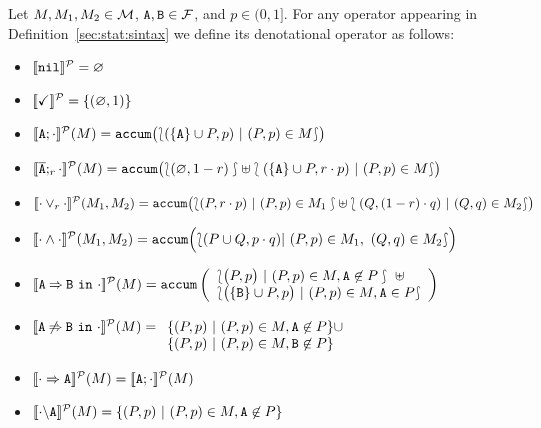 \bdfn\label{def:semantic:operators}
  Let $M,M_1,M_2\in{\cal M}$, ${\mathtt{A}},{\mathtt{B}}\in{\cal F}$, and $p\in(0,1]$. For any operator appearing in
  Definition~\ref{sec:stat:sintax} we define its denotational operator
  as follows:
  \begin{itemize}

  \item $[\![\mathtt{nil}]\!]^{\cal P}=\varnothing$

  \item $[\![\checkmark]\!]^{\cal P}=\{(\varnothing,1)\}$

  \item
    $[\![\mathtt{A};\cdot]\!]^{\cal P}(M)=
      \mathtt{accum}\bigl(\lbag(\{\mathtt{A}\}\cup P,p)\ |\ (P,p)\in M\rbag\bigr)
         $

  \item
    $[\![\overline{\mathtt{A}};_{r}\cdot]\!]^{\cal P}(M)=
                \mathtt{accum}\bigl(\lbag(\varnothing , 1-r )\rbag\uplus\lbag (\{\mathtt{A}\}\cup P, r\cdot p ) \ |\ (P,p) \in M\rbag\bigr)$

  \item
    $[\![\cdot\mathbin{\lor}_{r}\cdot]\!]^{\cal P}(M_{1},M_{2})=\mathtt{accum}\bigl(\lbag(P,r\cdot p  ) \ |\ (P,p) \in
    M_{1}\rbag \uplus \lbag(Q, (1-r)\cdot q  ) \ |\ (Q,q) \in M_{2}\rbag\bigr) $
  \item
    $
        [\![\cdot\mathbin{\wedge}\cdot]\!]^{\cal P}(M_{1},M_{2})= \mathtt{accum}\Bigl(
                \lbag (P\cup Q, p\cdot q)  |\ (P,p) \in M_{1},\ (Q,q) \in M_{2}\rbag\Bigr)
    $

  \item
    $[\![\mathtt{A}\mathbin{\Rightarrow}\mathtt{B}\ \mathtt{in}\ \cdot]\!]^{\cal P}(M)=\mathtt{accum}\left(\begin{array}{l}
      \lbag\bigl(P,p\bigr)\ |\  (P,p)\in M, \mathtt{A}\not\in P\rbag\ \uplus\\
      \lbag\bigl(\{\mathtt{B}\}\cup P ,p\bigr)\ |\ (P,p)\in M, \mathtt{A}\in P\rbag \\
      \end{array}\right)$

  \item
    $[\![\mathtt{A}\mathbin{\not\Rightarrow}\mathtt{B}\ \mathtt{in}\ \cdot]\!]^{\cal P}(M)=\begin{array}[t]{l}
      \{(P,p)\ |\ (P,p)\in M, \mathtt{A}\not\in P\}\cup\\
      \{(P,p)\ |\ (P,p)\in M, \mathtt{B}\not\in P\}
      \end{array}$

    \item $[\![\cdot\Rightarrow\mathtt{A}]\!]^{\cal P}(M) = [\![\mathtt{A};{\cdot}]\!]^{\cal P}(M)$

    \item
      $[\![\cdot\backslash\mathtt{A}]\!]^{\cal P}(M) = \{(P,p)\ |\ (P, p) \in M, \mathtt{A}\not\in P      \}$

  \end{itemize}
\edfn

